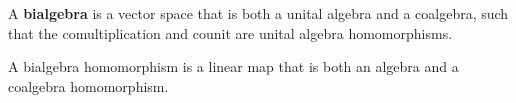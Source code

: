 \documentclass[12pt]{article}
\theoremstyle{inlinedefn}
\theoremstyle{break}
\begin{document}
A \textbf{bialgebra} is a vector space that is both a unital algebra and a coalgebra, such that the comultiplication and counit are unital algebra homomorphisms.

A bialgebra homomorphism is a linear map that is both an algebra and a coalgebra homomorphism.
\end{document}
